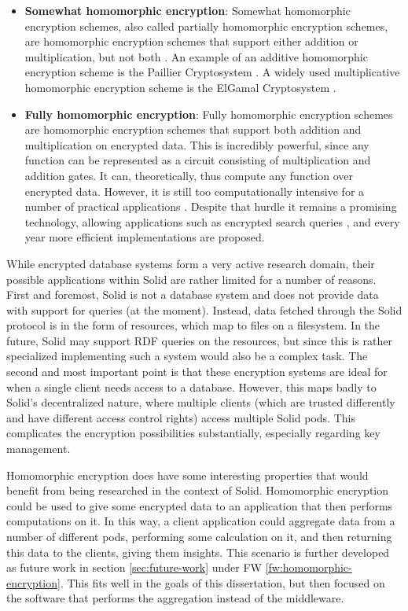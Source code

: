 \begin{itemize}
    \item \textbf{Somewhat homomorphic encryption}: Somewhat homomorphic encryption schemes, also called partially homomorphic encryption schemes, are homomorphic encryption schemes that support either addition or multiplication, but not both \citep{she}. An example of an additive homomorphic encryption scheme is the Paillier Cryptosystem \citep{paillier}. A widely used multiplicative homomorphic encryption scheme is the ElGamal Cryptosystem \citep{elgamal}.
    \item \textbf{Fully homomorphic encryption}: Fully homomorphic encryption schemes are homomorphic encryption schemes that support both addition and multiplication on encrypted data. This is incredibly powerful, since any function can be represented as a circuit consisting of multiplication and addition gates. It can, theoretically, thus compute any function over encrypted data. However, it is still too computationally intensive for a number of practical applications \citep{he-practical, pragmatic-mpc}. Despite that hurdle it remains a promising technology, allowing applications such as encrypted search queries \citep{fhe}, and every year more efficient implementations are proposed.
\end{itemize}

\noindent While encrypted database systems form a very active research domain, their possible applications within Solid are rather limited for a number of reasons. First and foremost, Solid is not a database system and does not provide data with support for queries (at the moment). Instead, data fetched through the Solid protocol is in the form of resources, which map to files on a filesystem. In the future, Solid may support RDF queries on the resources, but since this is rather specialized implementing such a system would also be a complex task. The second and most important point is that these encryption systems are ideal for when a single client needs access to a database. However, this maps badly to Solid's decentralized nature, where multiple clients (which are trusted differently and have different access control rights) access multiple Solid pods. This complicates the encryption possibilities substantially, especially regarding key management. 

Homomorphic encryption does have some interesting properties that would benefit from being researched in the context of Solid. Homomorphic encryption could be used to give some encrypted data to an application that then performs computations on it. In this way, a client application could aggregate data from a number of different pods, performing some calculation on it, and then returning this data to the clients, giving them insights. This scenario is further developed as future work in section \ref{sec:future-work} under FW \ref{fw:homomorphic-encryption}. This fits well in the goals of this dissertation, but then focused on the software that performs the aggregation instead of the middleware.

